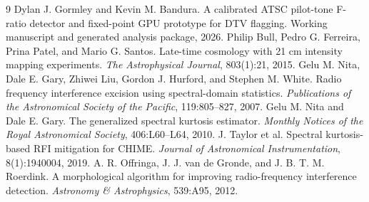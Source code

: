 \begin{thebibliography}{9}
Dylan J. Gormley and Kevin M. Bandura.
\newblock A calibrated ATSC pilot-tone F-ratio detector and fixed-point GPU prototype for DTV flagging.
\newblock Working manuscript and generated analysis package, 2026.
Philip Bull, Pedro G. Ferreira, Prina Patel, and Mario G. Santos.
\newblock Late-time cosmology with 21 cm intensity mapping experiments.
\newblock \emph{The Astrophysical Journal}, 803(1):21, 2015.
Gelu M. Nita, Dale E. Gary, Zhiwei Liu, Gordon J. Hurford, and Stephen M. White.
\newblock Radio frequency interference excision using spectral-domain statistics.
\newblock \emph{Publications of the Astronomical Society of the Pacific}, 119:805--827, 2007.
Gelu M. Nita and Dale E. Gary.
\newblock The generalized spectral kurtosis estimator.
\newblock \emph{Monthly Notices of the Royal Astronomical Society}, 406:L60--L64, 2010.
J. Taylor et al.
\newblock Spectral kurtosis-based RFI mitigation for CHIME.
\newblock \emph{Journal of Astronomical Instrumentation}, 8(1):1940004, 2019.
A. R. Offringa, J. J. van de Gronde, and J. B. T. M. Roerdink.
\newblock A morphological algorithm for improving radio-frequency interference detection.
\newblock \emph{Astronomy \& Astrophysics}, 539:A95, 2012.
\end{thebibliography}
